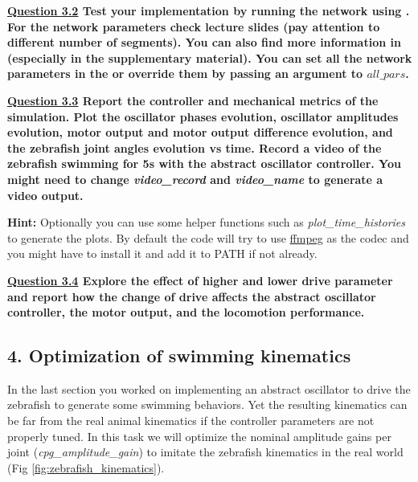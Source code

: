 \documentclass{cmc}
\begin{document}
\textbf{\underline{Question 3.2} Test your implementation by running the network using . For the network parameters check lecture slides (pay attention to different number of segments). You can also	find more information in~\cite{ijspeert2007swimming} (especially in the supplementary material). You can set all the network parameters in the  or override them by passing an argument to $all\_pars$. }

\textbf{\underline{Question 3.3} Report the controller and mechanical metrics of the simulation. Plot the oscillator phases evolution, oscillator amplitudes evolution, motor output and motor output difference evolution, and the zebrafish joint angles evolution vs time. Record a video of the zebrafish swimming for 5s with the abstract oscillator controller. You might need to change \textit{video\_record} and \textit{video\_name} to generate a video output.  }

\textbf{Hint:} Optionally you can use some helper functions such as \textit{plot\_time\_histories} to generate the plots. By default the code will try to use \href{https://ffmpeg.org/download.html}{ffmpeg} as the codec and you might have to install it and add it to PATH if not already.

\textbf{\underline{Question 3.4} Explore the effect of higher and lower drive parameter and report how the change of drive affects the abstract oscillator controller, the motor output, and the locomotion performance.  }



\subsection*{4. Optimization of swimming kinematics}

In the last section you worked on implementing an abstract oscillator to drive the zebrafish to generate some swimming behaviors. Yet the resulting kinematics can be far from the real animal kinematics if the controller parameters are not properly tuned. In this task we will optimize the nominal amplitude gains per joint (\textit{cpg\_amplitude\_gain}) to imitate the zebrafish kinematics in the real world (Fig \ref{fig:zebrafish_kinematics}).
\end{document}
